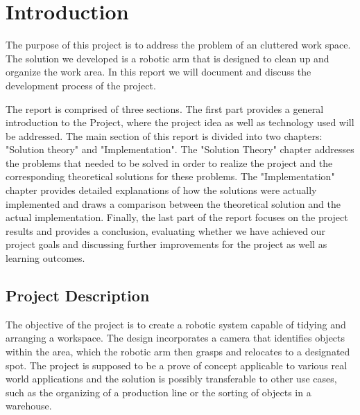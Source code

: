 
\chapter{Introduction} %
\label{CH1} %
The purpose of this project is to address the problem of an cluttered work space.
The solution we developed is a robotic arm that is designed to clean up and organize the work area. 
In this report we will document and discuss the development process of the project. 

The report is comprised of three sections. The first part provides a general introduction to the Project, where the project idea as well as technology used will be addressed. The main section of this report is divided into two chapters: "Solution theory" and "Implementation".
The "Solution Theory" chapter addresses the problems that needed to be solved in order to realize the project and the corresponding theoretical solutions for these problems. 
The "Implementation" chapter provides detailed explanations of how the solutions were actually implemented and draws a comparison between the theoretical solution and the actual implementation. Finally, the last part of the report focuses on the project results and provides a conclusion, evaluating whether we have achieved our project goals and discussing further improvements for the project as well as learning outcomes. 

\section{Project Description}

The objective of the project is to create a robotic system capable of tidying and arranging a workspace. The design incorporates a camera that identifies objects within the area, which the robotic arm then grasps and relocates to a designated spot. The project is supposed to be a prove of concept applicable to various real world applications and the solution is possibly transferable to other use cases, such as the organizing of a production line or the sorting of objects in a warehouse.

